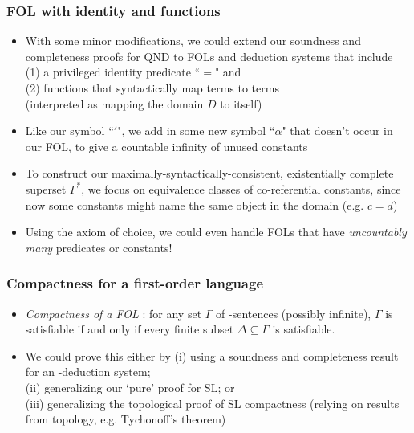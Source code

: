 \begin{frame}
\frametitle{FOL with identity and functions}

\begin{itemize}[<+->]


\item With some minor modifications, we could extend our soundness and completeness proofs for QND to FOLs and deduction systems that include (1) a privileged identity predicate ``$=$" and \\ (2) functions that syntactically map terms to terms \\ (interpreted as mapping the domain $D$ to itself)

\item Like our symbol ``$\prime$", we add in some new symbol ``$\alpha$" that doesn't occur in our FOL, to give a countable infinity of unused constants

\item To construct our maximally-syntactically-consistent, existentially complete superset $\Gamma^{\ast}$, we focus on equivalence classes of co-referential constants, since now some constants might name the same object in the domain (e.g. $c=d$) 


\item Using the axiom of choice, we could even handle FOLs that have  \textit{uncountably many} predicates or constants!

\end{itemize}
\end{frame}

\begin{frame}
\frametitle{Compactness for a first-order language}

\begin{itemize}[<+->]

\item \emph{Compactness of a FOL }: for any set $\Gamma$ of -sentences (possibly infinite), $\Gamma$ is satisfiable if and only if every finite subset $\Delta \subseteq \Gamma$ is satisfiable. 

\item We could prove this either by (i) using a soundness and completeness result for an -deduction system; \\ (ii) generalizing our `pure' proof for SL; or \\ (iii) generalizing the topological proof of SL compactness (relying on results from topology, e.g. Tychonoff's theorem)


\end{itemize}
\end{frame}

